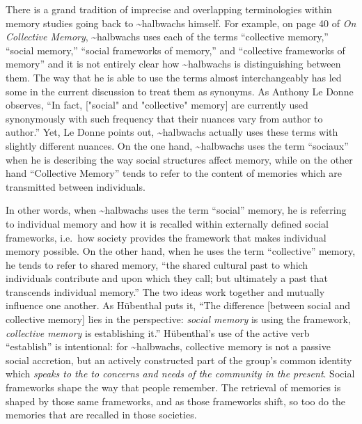 There is a grand tradition of imprecise and overlapping terminologies
within memory studies going back to \textasciitilde{}halbwachs himself.
For example, on page 40 of \emph{On Collective Memory},
\textasciitilde{}halbwachs uses each of the terms ``collective memory,''
``social memory,'' ``social frameworks of memory,'' and ``collective
frameworks of memory'' and it is not entirely clear how
\textasciitilde{}halbwachs is distinguishing between them. The way that
he is able to use the terms almost interchangeably has led some in the
current discussion to treat them as synonyms. As Anthony Le Donne
observes, ``In fact, {[}"social" and "collective" memory{]} are
currently used synonymously with such frequency that their nuances vary
from author to author.''\autocite[42 n.8]{ledonne2009} Yet, Le Donne
points out, \textasciitilde{}halbwachs actually uses these terms with
slightly different nuances. On the one hand, \textasciitilde{}halbwachs
uses the term ``sociaux'' when he is describing the way social
structures affect memory, while on the other hand ``Collective Memory''
tends to refer to the content of memories which are transmitted between
individuals.

In other words, when \textasciitilde{}halbwachs uses the term ``social''
memory, he is referring to individual memory and how it is recalled
within externally defined social frameworks, i.e.~how society provides
the framework that makes individual memory
possible.\autocite[180]{hubenthal_carstens-hasselbalch2012} On the other
hand, when he uses the term ``collective'' memory, he tends to refer to
shared memory, ``the shared cultural past to which individuals
contribute and upon which they call; but ultimately a past that
transcends individual memory.''\autocites[360]{keith_ec2015}[See
also][180]{hubenthal_carstens-hasselbalch2012} The two ideas work
together and mutually influence one another. As Hübenthal puts it, ``The
difference {[}between social and collective memory{]} lies in the
perspective: \emph{social memory} is using the framework,
\emph{collective memory} is establishing
it.''\autocite[180.]{hubenthal_carstens-hasselbalch2012} Hübenthal's use
of the active verb ``establish'' is intentional: for
\textasciitilde{}halbwachs, collective memory is not a passive social
accretion, but an actively constructed part of the group's common
identity which \emph{speaks to the to concerns and needs of the
community in the present}. Social frameworks shape the way that people
remember. The retrieval of memories is shaped by those same frameworks,
and as those frameworks shift, so too do the memories that are recalled
in those societies.\autocites[For a modern assessments on the
malleability of human memory and the effects of social networks on the
formation of collective memory,
see][]{coman-etal_pnas2016}{yamashiro-hirst_jarmc2014}{coman-etal_yang-etal2012}

